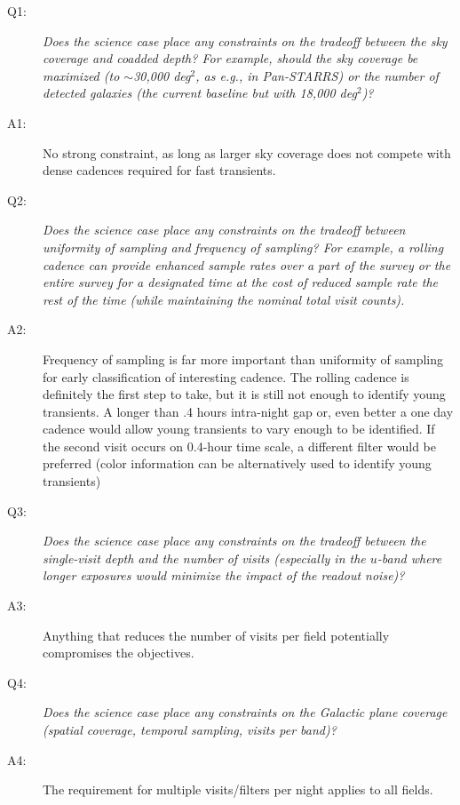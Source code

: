  \begin{description}

 \item[Q1:] {\it Does the science case place any constraints on the
 tradeoff between the sky coverage and coadded depth? For example, should
 the sky coverage be maximized (to $\sim$30,000 deg$^2$, as e.g., in
 Pan-STARRS) or the number of detected galaxies (the current baseline but
 with 18,000 deg$^2$)?}

 \item[A1:] No strong constraint, as long as larger sky coverage does not compete with dense cadences
required for fast transients.

 \item[Q2:] {\it Does the science case place any constraints on the
 tradeoff between uniformity of sampling and frequency of  sampling? For
 example, a rolling cadence can provide enhanced sample rates over a part
 of the survey or the entire survey for a designated time at the cost of
 reduced sample rate the rest of the time (while maintaining the nominal
 total visit counts).}

 \item[A2:] Frequency of sampling is far more important than uniformity of sampling for early classification of interesting cadence. The rolling cadence is definitely the first step to take, but it is still not enough to identify young transients. A longer than .4 hours intra-night gap or, even better a one day cadence would allow young transients to vary enough to be identified. If the second visit occurs on 0.4-hour time scale, a different filter would be preferred (color information can be alternatively used to identify young transients)
   

 \item[Q3:] {\it Does the science case place any constraints on the
 tradeoff between the single-visit depth and the number of visits
 (especially in the $u$-band where longer exposures would minimize the
 impact of the readout noise)?}

 \item[A3:] Anything that reduces the number of visits per field potentially compromises the objectives.

 \item[Q4:] {\it Does the science case place any constraints on the
 Galactic plane coverage (spatial coverage, temporal sampling, visits per
 band)?}

 \item[A4:] The requirement for multiple visits/filters per night applies to all fields.


\end{description}
